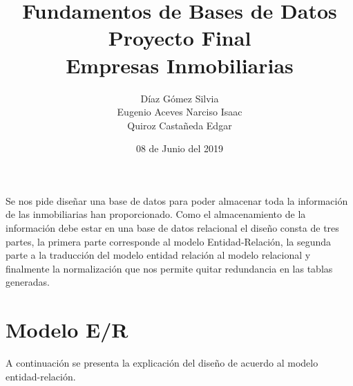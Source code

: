 \documentclass[10pt]{article}
\begin{document}
	\title{Fundamentos de Bases de Datos \\
		Proyecto Final\\ Empresas Inmobiliarias
	} 
	\author{Díaz Gómez Silvia \\
		Eugenio Aceves Narciso Isaac \\
		Quiroz Castañeda Edgar}
	\date{08 de Junio del 2019}
	\maketitle
	
	Se nos pide diseñar una base de datos para poder almacenar toda la información de  las inmobiliarias han proporcionado. Como el almacenamiento de la información debe estar en una base de datos relacional el diseño consta de tres partes, la primera parte corresponde al modelo Entidad-Relación, la segunda parte a la traducción del modelo entidad relación al modelo relacional y finalmente la normalización que nos permite quitar redundancia en las tablas generadas. 
	
	\section{Modelo E/R}
	
	A continuación se presenta la explicación del diseño de acuerdo al modelo entidad-relación.
	
\end{document}

